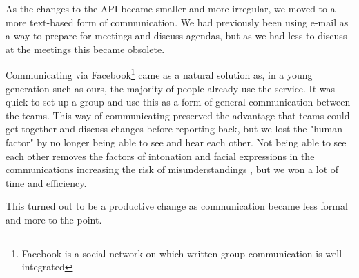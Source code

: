 As the changes to the API became smaller and more irregular, we moved to a more text-based form of communication. We had
previously been using e-mail as a way to prepare for meetings and discuss agendas, but as we had less to discuss at the
meetings this became obsolete.

Communicating via Facebook\footnote{Facebook is a social network on which written group communication is well integrated} came as a natural solution as, in a young generation such as ours, the majority of people
already use the service. It was quick to set up a group and use this as a form of general communication between the teams. This way
of communicating preserved the advantage that teams could get together and discuss changes before reporting back,
but we lost the "human factor" by no longer being able to see and hear each other.
Not being able to see each other removes the factors of intonation and facial expressions in the communications increasing the risk of
misunderstandings , but we won a lot of time and efficiency.

This turned out to be a productive change as communication became less formal and more to the point.  
